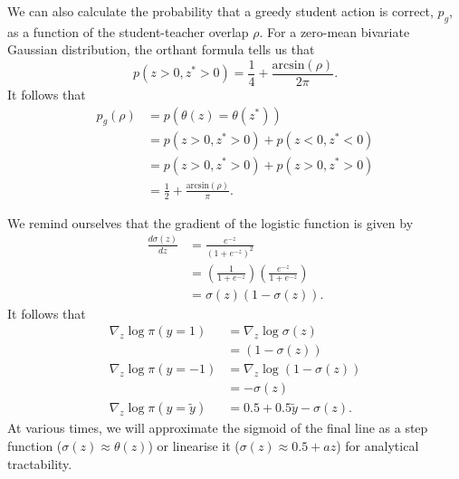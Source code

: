 \documentclass{article}
\begin{document}
We can also calculate the probability that a greedy student action is correct, $p_g$, as a function of the student-teacher overlap $\rho$.
For a zero-mean bivariate Gaussian distribution, the orthant formula tells us that
\begin{equation}
    p(z >0, z^* > 0) = \frac{1}{4} + \frac{\text{arcsin}(\rho)}{2 \pi}.
\end{equation}
It follows that
\begin{align}
    p_g(\rho) &= p(\theta(z) = \theta(z^*))\\
    &= p(z >0, z^* > 0) + p(z < 0, z^* < 0)\\
    &= p(z >0, z^* > 0) + p(z >0, z^* > 0)\\
    &= \frac{1}{2} + \frac{\text{arcsin}(\rho)}{\pi}. \label{eq:pg}
\end{align}

We remind ourselves that the gradient of the logistic function is given by
\begin{align}
    \frac{d \sigma (z)}{dz} &= \frac{e^{-z}}{(1 + e^{-z})^2}\\
    &= \left ( \frac{1}{1 + e^{-z}} \right ) \left ( \frac{e^{-z}}{1 + e^{-z}} \right ) \\
    &= \sigma(z) (1 - \sigma(z)).
\end{align}
It follows that
\begin{align}
    \nabla_z \log \pi(y = 1) &= \nabla_z \log \sigma(z)\\
    &= (1 - \sigma (z))\\
    \nabla_z \log \pi (y = -1) &= \nabla_z \log (1 - \sigma(z))\\
    &= - \sigma (z)\\
    \nabla_z \log \pi (y = \tilde{y}) &= 0.5 + 0.5 \tilde{y} - \sigma(z).
    \label{eq:logsig_grad}
\end{align}
At various times, we will approximate the sigmoid of the final line as a step function ($\sigma(z) \approx \theta (z)$) or linearise it ($\sigma(z) \approx 0.5 + a z$) for analytical tractability.
\end{document}
